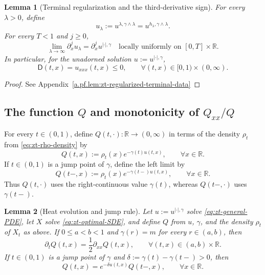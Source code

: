 \documentclass[10pt]{amsart}
\newtheorem{lemma}[lemma]{Lemma}
\theoremstyle{definition}
\theoremstyle{remark}
\numberwithin{equation}{section}
\newcommand{\R}{\mathbb R}
\newcommand{\1}{\mathbf 1}
\begin{document}
\begin{lemma}[Terminal regularization and the third-derivative sign]
\label{lem:zt-regularized-terminal-data}
For every $\lambda>0$, define
\begin{equation*}
 u_\lambda:=u^{\lambda,\gamma\wedge\lambda}=u^{h_\lambda,\gamma\wedge\lambda}.
\end{equation*}
For every $T<1$ and $j\geq0$,
\begin{equation}
 \lim_{\lambda\to\infty}\partial_x^ju_\lambda
 =\partial_x^ju^{|\cdot|,\gamma}
 \quad\text{locally uniformly on }[0,T]\times\R.
 \label{eq:zt-lambda-smooth-convergence}
\end{equation}
In particular, for the unadorned solution $u:=u^{|\cdot|,\gamma}$,
\begin{equation}
 \mathsf D(t,x)=u_{xxx}(t,x)\leq0,
 \qquad \forall (t,x)\in[0,1)\times(0,\infty).
 \label{eq:zt-D-negative}
\end{equation}
\end{lemma}

\begin{proof}
See Appendix~\ref{a.pf.lem:zt-regularized-terminal-data}
\end{proof}

\subsection{\texorpdfstring{The function $Q$ and monotonicity of $Q_{xx}/Q$}{The function Q and monotonicity of Qxx/Q}}
\label{sec:zt-Q-properties}

For every $t\in(0,1)$, define $Q(t,\cdot):\R\to(0,\infty)$ in terms of the density $\rho_t$ from \eqref{eq:zt-rho-density} by
\begin{equation}
 Q(t,x):=\rho_t(x)e^{-\gamma(t)u(t,x)},
 \qquad \forall x\in\R.
 \label{eq:zt-Q-def}
\end{equation}
If $t\in(0,1)$ is a jump point of $\gamma$, define the left limit by
\begin{equation*}
 Q(t-,x):=\rho_t(x)e^{-\gamma(t-)u(t,x)},
 \qquad \forall x\in\R.
\end{equation*}
Thus $Q(t,\cdot)$ uses the right-continuous value $\gamma(t)$, whereas $Q(t-,\cdot)$ uses $\gamma(t-)$.

\begin{lemma}[Heat evolution and jump rule]
\label{lem:zt-Q-dynamics}
Let $u:=u^{|\cdot|,\gamma}$ solve \eqref{eq:zt-general-PDE}, let $X$ solve \eqref{eq:zt-optimal-SDE}, and define $Q$ from $u$, $\gamma$, and the density $\rho_t$ of $X_t$ as above. If $0\leq a<b<1$ and $\gamma(r)=m$ for every $r\in(a,b)$, then
\begin{equation}
 \partial_tQ(t,x)=\frac12\partial_{xx}Q(t,x),
 \qquad \forall (t,x)\in(a,b)\times\R.
 \label{eq:zt-Q-heat}
\end{equation}
If $t\in(0,1)$ is a jump point of $\gamma$ and $\delta:=\gamma(t)-\gamma(t-)>0$, then
\begin{equation}
 Q(t,x)=e^{-\delta u(t,x)}Q(t-,x),
 \qquad \forall x\in\R.
 \label{eq:zt-Q-jump}
\end{equation}
\end{lemma}
\end{document}

